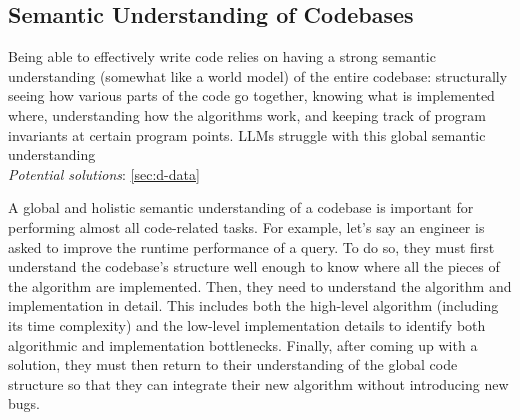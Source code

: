 \subsection{Semantic Understanding of Codebases} \label{sec:c-global-understanding}

\begin{tcolorbox}[colback=lightgreen, boxrule=0pt, arc=5pt, outer arc=5pt, after skip=10pt plus 2pt]
Being able to effectively write code relies on having a strong semantic understanding (somewhat like a world model) of the entire codebase: structurally seeing how various parts of the code go together, knowing what is implemented where, understanding how the algorithms work, and keeping track of program invariants at certain program points. LLMs struggle with this global semantic understanding
\newline \\
\textit{Potential solutions}: \ref{sec:d-data}
\end{tcolorbox}



A global and holistic semantic understanding of a codebase is important for performing almost all code-related tasks. For example, let's say an engineer is asked to improve the runtime performance of a query. To do so, they must first understand the codebase's structure well enough to know where all the pieces of the algorithm are implemented. Then, they need to understand the algorithm and implementation in detail. This includes both the high-level algorithm (including its time complexity) and the low-level implementation details to identify both algorithmic and implementation bottlenecks. Finally, after coming up with a solution, they must then return to their understanding of the global code structure so that they can integrate their new algorithm without introducing new bugs. 



